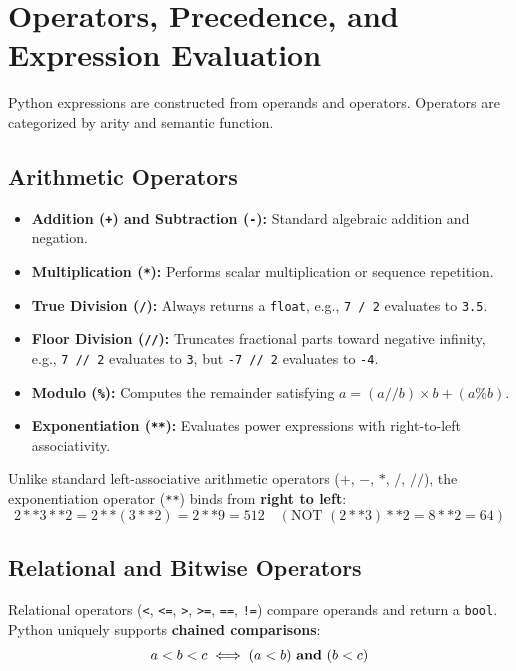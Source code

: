 \section{Operators, Precedence, and Expression Evaluation}

Python expressions are constructed from operands and operators. Operators are categorized by arity and semantic function.

\subsection{Arithmetic Operators}
\begin{itemize}[leftmargin=1.8em, itemsep=3pt]
    \item \textbf{Addition (\texttt{+}) and Subtraction (\texttt{-}):} Standard algebraic addition and negation.
    \item \textbf{Multiplication (\texttt{*}):} Performs scalar multiplication or sequence repetition.
    \item \textbf{True Division (\texttt{/}):} Always returns a \texttt{float}, e.g., \texttt{7 / 2} evaluates to \texttt{3.5}.
    \item \textbf{Floor Division (\texttt{//}):} Truncates fractional parts toward negative infinity, e.g., \texttt{7 // 2} evaluates to \texttt{3}, but \texttt{-7 // 2} evaluates to \texttt{-4}.
    \item \textbf{Modulo (\texttt{\%}):} Computes the remainder satisfying $a = (a // b) \times b + (a \% b)$.
    \item \textbf{Exponentiation (\texttt{**}):} Evaluates power expressions with right-to-left associativity.
\end{itemize}

\begin{warningbox}
Unlike standard left-associative arithmetic operators ($+$, $-$, $*$, $/$, $//$), the exponentiation operator (\texttt{**}) binds from \textbf{right to left}:
\begin{equation}
2 ** 3 ** 2 = 2 ** (3 ** 2) = 2 ** 9 = 512 \quad (\text{NOT } (2 ** 3) ** 2 = 8 ** 2 = 64)
\end{equation}
\end{warningbox}

\subsection{Relational and Bitwise Operators}
Relational operators (\texttt{<}, \texttt{<=}, \texttt{>}, \texttt{>=}, \texttt{==}, \texttt{!=}) compare operands and return a \texttt{bool}. Python uniquely supports \textbf{chained comparisons}:
\begin{equation}
a < b < c \iff (a < b) \text{ \textbf{and} } (b < c)
\end{equation}


